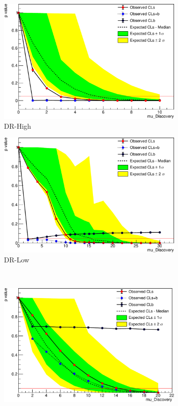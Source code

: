 \begin{figure}[tp]
\centering
\begin{subfigure}{0.48\textwidth}
\centering
\includegraphics[width=\textwidth]{figures/2ljets_upper_limit_scan_drhigh.pdf}
\caption{DR-High}
\end{subfigure}
\hfill
\begin{subfigure}{0.48\textwidth}
\centering
\includegraphics[width=\textwidth]{figures/2ljets_upper_limit_scan_drlow.pdf}
\caption{DR-Low}
\end{subfigure}
\\[1.5ex]
\begin{subfigure}{0.48\textwidth}
\centering
\includegraphics[width=\textwidth]{figures/2ljets_upper_limit_scan_droffshell.pdf}

\end{subfigure}
\end{figure}
